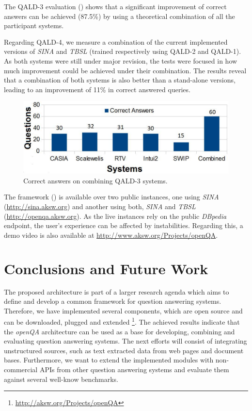 \documentclass{acm_proc_article-sp}
\begin{document}
\vspace{-4.0mm}
The QALD-3 evaluation () shows that a significant improvement of correct answers can be achieved (87.5\%) by using a theoretical combination of all the participant systems.

Regarding QALD-4, we measure a combination of the current implemented versions of \emph{SINA} and \emph{TBSL} (trained respectively using QALD-2 and QALD-1). 
As both systems were still under major revision, the tests were focused in how much improvement could be achieved under their combination. 
The results reveal that a combination of both systems is also better than a stand-alone versions, leading to an improvement of 11\% in correct answered queries.

\begin{figure}[h]
	\centering
	\includegraphics[width=\columnwidth]{images/right_answers.pdf}	
	\caption{Correct answers on combining QALD-3 systems.}
	\label{fig:combining}
\end{figure}

The framework () is available over two public instances,
one using \emph{SINA} (\url{http://sina.aksw.org}) and another using both, \emph{SINA} and \emph{TBSL} (\url{http://openqa.aksw.org}).
As the live instances rely on the public \emph{DBpedia} endpoint, the user's experience can be affected by instabilities.
Regarding this, a demo video is also available at \url{http://www.aksw.org/Projects/openQA}.

\vspace{8.0mm}
\section{Conclusions and Future Work}
\label{sec:conc}

The proposed architecture is part of a larger research agenda which aims to define and develop a common framework for question answering systems.
Therefore, we have implemented several components, which are open source and can be downloaded, plugged and extended \footnote{\url{http://aksw.org/Projects/openQA}}.
The achieved results indicate that the \emph{openQA} architecture can be used as a base for developing, combining and evaluating question answering systems.
The next efforts will consist of integrating unstructured sources, such as text extracted data from web pages and document bases.
Furthermore, we want to extend the implemented modules with non-commercial APIs from other question answering systems and evaluate them against several well-know benchmarks. 
\end{document}
